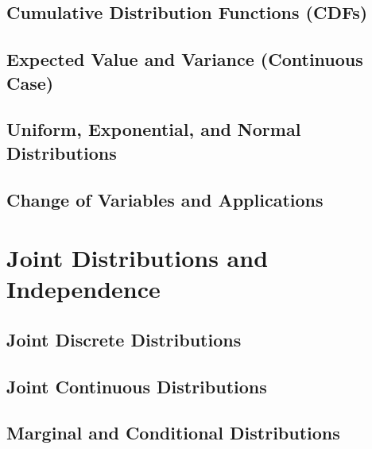 \documentclass[
  12pt,
]{krantzNoCorner}
\begin{document}
\hypertarget{cumulative-distribution-functions-cdfs-1}{%
\section{Cumulative Distribution Functions (CDFs)}\label{cumulative-distribution-functions-cdfs-1}}

\hypertarget{expected-value-and-variance-continuous-case}{%
\section{Expected Value and Variance (Continuous Case)}\label{expected-value-and-variance-continuous-case}}

\hypertarget{uniform-exponential-and-normal-distributions}{%
\section{Uniform, Exponential, and Normal Distributions}\label{uniform-exponential-and-normal-distributions}}

\hypertarget{change-of-variables-and-applications}{%
\section{Change of Variables and Applications}\label{change-of-variables-and-applications}}

\hypertarget{joint-distributions-and-independence}{%
\chapter{Joint Distributions and Independence}\label{joint-distributions-and-independence}}

\hypertarget{joint-discrete-distributions}{%
\section{Joint Discrete Distributions}\label{joint-discrete-distributions}}

\hypertarget{joint-continuous-distributions}{%
\section{Joint Continuous Distributions}\label{joint-continuous-distributions}}

\hypertarget{marginal-and-conditional-distributions}{%
\section{Marginal and Conditional Distributions}\label{marginal-and-conditional-distributions}}
\end{document}
